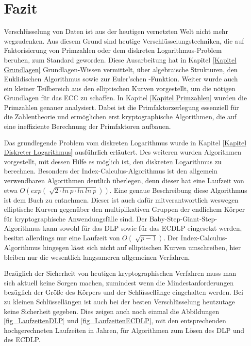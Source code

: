 \section{Fazit}
	Verschlüsselung von Daten ist aus der heutigen vernetzten Welt nicht mehr wegzudenken. Aus diesem Grund sind heutige Verschlüsselungstechniken, die auf Faktorisierung von Primzahlen oder dem diskreten Logarithmus-Problem beruhen, zum Standard geworden. Diese Ausarbeitung hat in Kapitel \ref{Kapitel Grundlagen} Grundlagen-Wissen vermittelt, über algebraische Strukturen, den Euklidischen Algorithmus sowie zur Euler’schen \myPhi -Funktion. Weiter wurde auch ein kleiner Teilbereich aus den elliptischen Kurven vorgestellt, um die nötigen Grundlagen für das ECC zu schaffen. In Kapitel \ref{Kapitel Primzahlen} wurden die Primzahlen genauer analysiert. Dabei ist die Primfaktorzerlegung essenziell für die Zahlentheorie und ermöglichen erst kryptographische Algorithmen, die auf eine ineffiziente Berechnung der Primfaktoren aufbauen.
	
	Das grundlegende Problem vom diskreten Logarithmus wurde in Kapitel \ref{Kapitel Diskreter Logarithmus} ausführlich erläutert. Des weiteren wurden Algorithmen vorgestellt, mit dessen Hilfe es möglich ist, den diskreten Logarithmus zu berechnen. Besonders der Index-Calculus-Algorithmus ist den allgemein verwendbaren Algorithmen deutlich überlegen, denn dieser hat eine Laufzeit von etwa $O(exp(\sqrt[]{2 \cdot ln~p \cdot ln~ln~p}))$. Eine genaue Beschreibung diese Algorithmus ist dem Buch \cite{Einfuehrung:in:die:Kryptographie} zu entnehmen. Dieser ist auch dafür mitverantwortlich weswegen elliptische Kurven gegenüber den multiplikativen Gruppen der endlichem Körper für kryptographische Anwendungsfälle  sind. Der Baby-Step-Giant-Step-Algorithmus kann sowohl für das DLP sowie für das ECDLP eingesetzt werden, besitzt allerdings nur eine Laufzeit von $O(\sqrt[]{p-1})$. Der Index-Calculus-Algorithmus hingegen lässt sich nicht auf elliptischen Kurven umschreiben, hier bleiben nur die wesentlich langsameren allgemeinen Verfahren.\cite{Mathematisch:fuer:fortgeschrittene:Anfaenger}
	
	Bezüglich der Sicherheit von heutigen kryptographischen Verfahren muss man sich aktuell keine Sorgen machen, zumindest wenn die Mindestanforderungen bezüglich der Größe des Körpers und der Schlüssellänge eingehalten werden. Bei zu kleinen Schlüssellängen ist auch bei der besten Verschlüsselung heutzutage keine Sicherheit gegeben. Dies zeigen auch noch einmal die Abbildungen \ref{fig_LaufzeitenDLP} und \ref{fig_LaufzeitenECDLP}, mit den entsprechenden hochgerechneten Laufzeiten in Jahren, für Algorithmen zum Lösen des DLP und des ECDLP.
	
